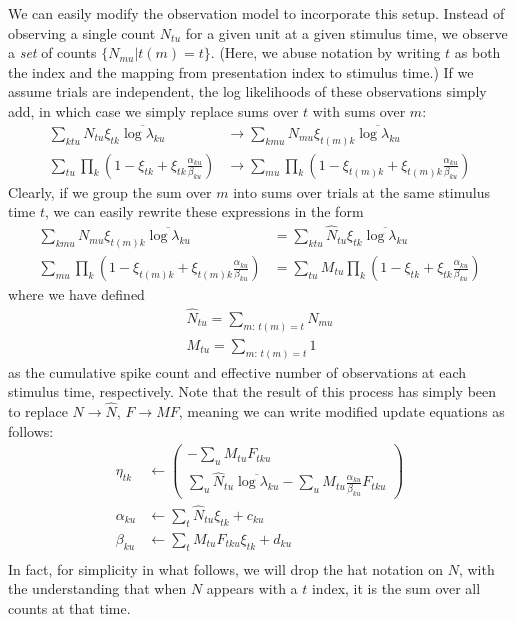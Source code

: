 \documentclass[11pt]{article}
\begin{document}
We can easily modify the observation model to incorporate this setup. Instead of observing a single count $N_{tu}$ for a given unit at a given stimulus time, we observe a \emph{set} of counts $\{ N_{m u} \vert t(m) = t \}$. (Here, we abuse notation by writing $t$ as both the index and the mapping from presentation index to stimulus time.) If we assume trials are independent, the log likelihoods of these observations simply add, in which case we simply replace sums over $t$ with sums over $m$: 
\begin{align}
    \sum_{ktu} N_{tu} \xi_{tk} \overline{\log \lambda_{ku}} &\rightarrow \sum_{km u} N_{m u} \xi_{t(m) k} \overline{\log \lambda_{ku}} \\
    \sum_{tu} \prod_k \left( 1 - \xi_{tk} + \xi_{tk} \frac{\alpha_{ku}}{\beta_{ku}}\right) &\rightarrow \sum_{m u} \prod_k \left( 1 - \xi_{t(m) k} + \xi_{t(m) k} \frac{\alpha_{ku}}{\beta_{ku}}\right)
\end{align}
Clearly, if we group the sum over $m$ into sums over trials at the same stimulus time $t$, we can easily rewrite these expressions in the form
\begin{align}
    \sum_{km u} N_{m u} \xi_{t(m) k} \overline{\log \lambda_{ku}} &= \sum_{ktu} \hat{N}_{tu} \xi_{tk} \overline{\log \lambda_{ku}} \\
    \sum_{m u} \prod_k \left( 1 - \xi_{t(m) k} + \xi_{t(m) k} \frac{\alpha_{ku}}{\beta_{ku}}\right) &= \sum_{tu} M_{tu}\prod_k \left( 1 - \xi_{tk} + \xi_{tk} \frac{\alpha_{ku}}{\beta_{ku}}\right)
\end{align}
where we have defined
\begin{align}
    \hat{N}_{tu} = \sum_{m:\, t(m) = t} N_{m u} \\
    M_{tu} = \sum_{m:\, t(m) = t} 1
\end{align}
as the cumulative spike count and effective number of observations at each stimulus time, respectively. Note that the result of this process has simply been to replace $N \rightarrow \hat{N}$, $F \rightarrow M F$, meaning we can write modified update equations as follows:
\begin{align}
    \eta_{tk} &\leftarrow 
    \begin{pmatrix}
        -\sum_u M_{tu} F_{tku} \\
        \sum_u \hat{N}_{tu} \overline{\log \lambda_{ku}} -
        \sum_u M_{tu}\frac{\alpha_{ku}}{\beta_{ku}} F_{tku} 
    \end{pmatrix} \\
    \alpha_{ku} &\leftarrow \sum_t \hat{N}_{tu} \xi_{tk} + c_{ku} \\
    \beta_{ku} &\leftarrow \sum_t M_{tu} F_{tku}\xi_{tk} + d_{ku} \\
\end{align}
In fact, for simplicity in what follows, we will drop the hat notation on $N$, with the understanding that when $N$ appears with a $t$ index, it is the sum over all counts at that time.
\end{document}
